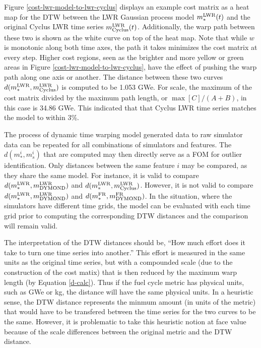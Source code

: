 Figure \ref{cost-lwr-model-to-lwr-cyclus} displays an example cost matrix 
as a heat map for the DTW between the LWR Gaussian process model 
$m_*^{\mathrm{LWR}}(t)$ and the original Cyclus LWR time series $m_{\mathrm{Cyclus}}^{\mathrm{LWR}}(t)$.
Additionally, the warp path between these two is shown as the white curve
on top of the heat map. Note that while $w$ is monotonic along both time axes, the
path it takes minimizes the cost matrix at every step. Higher cost regions,
seen as the brighter and more yellow or green areas in Figure \ref{cost-lwr-model-to-lwr-cyclus},
have the effect of pushing the warp path along one axis or another. The 
distance between these two curves $d(m_*^{\mathrm{LWR}}, m_{\mathrm{Cyclus}}^{\mathrm{LWR}})$ is computed 
to be 1.053 GWe. For scale, the maximum of the cost matrix divided by the 
maximum path length, or $\max[C]/(A+B)$, in this case is 34.86 GWe.  This 
indicated that that Cyclus LWR time series matches the model to within 3\%.

The process of dynamic time warping model generated data to raw simulator data can be 
repeated for all combinations of simulators and features. The 
$d(m_*^i, m_s^i)$ that are computed may then directly serve as a FOM for
outlier identification. Only distances between the same feature $i$ may be compared,
as they share the same model. For instance, it is valid to compare
$d(m_*^{\mathrm{LWR}}, m_{\mathrm{DYMOND}}^{\mathrm{LWR}})$ and $d(m_*^{\mathrm{LWR}}, m_{\mathrm{Cyclus}}^{\mathrm{LWR}})$. However,  
it is not valid to compare $d(m_*^{\mathrm{LWR}}, m_{\mathrm{DYMOND}}^{\mathrm{LWR}})$ and 
$d(m_*^{\mathrm{FR}}, m_{\mathrm{DYMOND}}^{\mathrm{FR}})$.  In the situation, where the simulators 
have different time grids, the model can be evaluated with each time grid
prior to computing the corresponding DTW distances and the comparison will
remain valid.

The interpretation of the DTW distances should be, ``How much effort does
it take to turn one time series into another.'' This effort is measured 
in the same units as the original time series, but with a compounded
scale (due to the construction of the cost matix) that is then reduced by 
the maximum warp length (by Equation \ref{d-calc}). Thus if the fuel 
cycle metric has physical units, such as GWe or kg, the distance will have 
the same physical units. In a heuristic sense, the DTW distance represents
the minmum amount (in units of the metric) that would have to be transfered
between the time series for the two curves to be the same. However, it is
problematic to take this heuristic notion at face value because of the 
scale differences between the original metric and the DTW distance.

